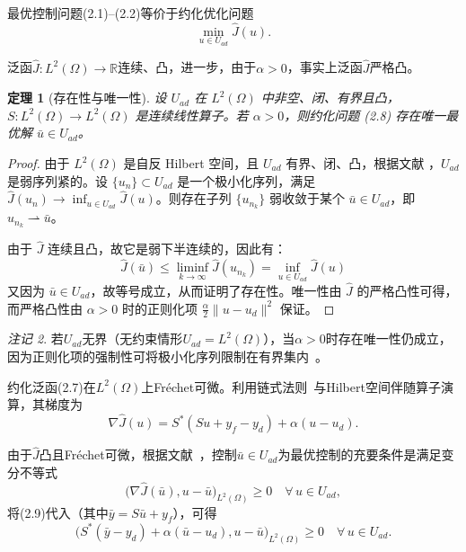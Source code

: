 \documentclass{xmu}
\theoremstyle{plain}
\newtheorem{theorem}{定理}[chapter]
\theoremstyle{remark}
\newtheorem{remark}[theorem]{注记}
\begin{document}
最优控制问题(2.1)–(2.2)等价于约化优化问题
\begin{equation}
\min_{u \in U_{ad}} \hat{J}(u).
\end{equation}

泛函$\hat{J} : L^2(\Omega) \to \mathbb{R}$连续、凸，进一步，由于$\alpha > 0$，事实上泛函$\hat{J}$严格凸。

\begin{theorem}[存在性与唯一性]
设 $U_{ad}$ 在 $L^2(\Omega)$ 中非空、闭、有界且凸，$S : L^2(\Omega) \to L^2(\Omega)$ 是连续线性算子。若 $\alpha > 0$，则约化问题 (2.8) 存在唯一最优解 $\bar{u} \in U_{ad}$。
\end{theorem}

\begin{proof}
由于 $L^2(\Omega)$ 是自反 Hilbert 空间，且 $U_{ad}$ 有界、闭、凸，根据文献 \cite[定理 2.11]{1}，$U_{ad}$ 是弱序列紧的。设 $\{u_n\} \subset U_{ad}$ 是一个极小化序列，满足 $\hat{J}(u_n) \to \inf_{u \in U_{ad}} \hat{J}(u)$。则存在子列 $\{u_{n_k}\}$ 弱收敛于某个 $\bar{u} \in U_{ad}$，即 $u_{n_k} \rightharpoonup \bar{u}$。

由于 $\hat{J}$ 连续且凸，故它是弱下半连续的，因此有：
$$
\hat{J}(\bar{u}) \le \liminf_{k \to \infty} \hat{J}(u_{n_k}) = \inf_{u \in U_{ad}} \hat{J}(u)
$$
又因为 $\bar{u} \in U_{ad}$，故等号成立，从而证明了存在性。唯一性由 $\hat{J}$ 的严格凸性可得，而严格凸性由 $\alpha > 0$ 时的正则化项 $\frac{\alpha}{2}\|u - u_d\|^2$ 保证。
\end{proof}

\begin{remark}
若$U_{ad}$无界（无约束情形$U_{ad} = L^2(\Omega)$），当$\alpha > 0$时存在唯一性仍成立，因为正则化项的强制性可将极小化序列限制在有界集内~\cite{1}。%
\end{remark}

约化泛函(2.7)在$L^2(\Omega)$上Fréchet可微。利用链式法则~\cite{1}与Hilbert空间伴随算子演算，其梯度为
\begin{equation}%
\nabla \hat{J}(u) = S^*(S u + y_f - y_d) + \alpha(u - u_d).
\end{equation}

由于$\hat{J}$凸且Fréchet可微，根据文献~\cite{1}，控制$\bar{u} \in U_{ad}$为最优控制的充要条件是满足变分不等式
\begin{equation}%
\bigl( \nabla \hat{J}(\bar{u}), u - \bar{u} \bigr)_{L^2(\Omega)} \ge 0 \quad \forall\, u \in U_{ad},
\end{equation}
将(2.9)代入（其中$\bar{y} = S\bar{u} + y_f$），可得
\begin{equation}
\bigl( S^*(\bar{y} - y_d) + \alpha(\bar{u} - u_d), u - \bar{u} \bigr)_{L^2(\Omega)} \ge 0 \quad \forall\, u \in U_{ad}.
\end{equation}
\end{document}
